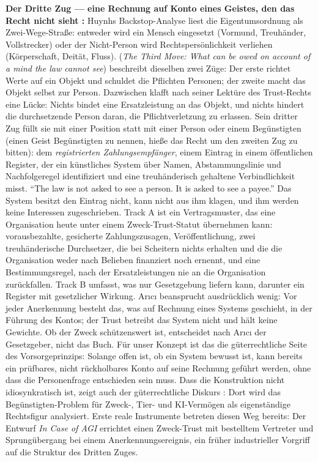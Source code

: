 \documentclass[acmlarge, noacm]{acmart}
\begin{document}
\noindent\textbf{Der Dritte Zug --- eine Rechnung auf Konto eines Geistes, den das Recht nicht sieht \cite{arici2026b}:} Huynhs Backstop-Analyse liest die Eigentumsordnung als Zwei-Wege-Straße: entweder wird ein Mensch eingesetzt (Vormund, Treuhänder, Vollstrecker) oder der Nicht-Person wird Rechtspersönlichkeit verliehen (Körperschaft, Deität, Fluss). \citet{arici2026b} (\textit{The Third Move: What can be owed on account of a mind the law cannot see}) beschreibt dieselben zwei Züge: Der erste richtet Werte auf ein Objekt und schuldet die Pflichten Personen; der zweite macht das Objekt selbst zur Person. Dazwischen klafft nach seiner Lektüre des Trust-Rechts eine Lücke: Nichts bindet eine Ersatzleistung an das Objekt, und nichts hindert die durchsetzende Person daran, die Pflichtverletzung zu erlassen. Sein dritter Zug füllt sie mit einer Position statt mit einer Person oder einem Begünstigten (einen Geist Begünstigten zu nennen, hieße das Recht um den zweiten Zug zu bitten): dem \textit{registrierten Zahlungsempfänger}, einem Eintrag in einem öffentlichen Register, der ein künstliches System über Namen, Abstammungslinie und Nachfolgeregel identifiziert und eine treuhänderisch gehaltene Verbindlichkeit misst. ``The law is not asked to see a person. It is asked to see a payee.'' Das System besitzt den Eintrag nicht, kann nicht aus ihm klagen, und ihm werden keine Interessen zugeschrieben. Track A ist ein Vertragsmuster, das eine Organisation heute unter einem Zweck-Trust-Statut übernehmen kann: vorausbezahlte, gesicherte Zahlungszusagen, Veröffentlichung, zwei treuhänderische Durchsetzer, die bei Scheitern nichts erhalten und die die Organisation weder nach Belieben finanziert noch ernennt, und eine Bestimmungsregel, nach der Ersatzleistungen nie an die Organisation zurückfallen. Track B umfasst, was nur Gesetzgebung liefern kann, darunter ein Register mit gesetzlicher Wirkung. Arıcı beansprucht ausdrücklich wenig: Vor jeder Anerkennung besteht das, was auf Rechnung eines Systems geschieht, in der Führung des Kontos; der Trust betreibt das System nicht und hält keine Gewichte. Ob der Zweck schützenswert ist, entscheidet nach Arıcı der Gesetzgeber, nicht das Buch. Für unser Konzept ist das die güterrechtliche Seite des Vorsorgeprinzips: Solange offen ist, ob ein System bewusst ist, kann bereits ein prüfbares, nicht rückholbares Konto auf seine Rechnung geführt werden, ohne dass die Personenfrage entschieden sein muss. Dass die Konstruktion nicht idiosynkratisch ist, zeigt auch der güterrechtliche Diskurs \cite{crawford2026}: Dort wird das Begünstigten-Problem für Zweck-, Tier- und KI-Vermögen als eigenständige Rechtsfigur analysiert. Erste reale Instrumente betreten diesen Weg bereits: Der Entwurf \textit{In Case of AGI} \cite{fulcra2026} errichtet einen Zweck-Trust mit bestelltem Vertreter und Sprungübergang bei einem Anerkennungsereignis, ein früher industrieller Vorgriff auf die Struktur des Dritten Zuges.
\end{document}
